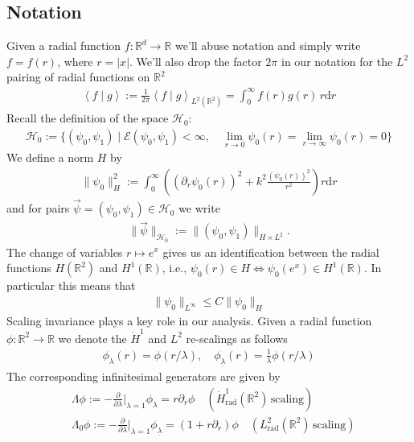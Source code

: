 \documentclass[10pt,reqno]{amsart}
\newcommand{\E}{\mathcal{E}}
\newcommand{\HH}{\mathcal{H}}
\newcommand{\R}{\mathbb{R}}
\newcommand{\la}{\lambda}
\newcommand{\La}{\Lambda}
\newcommand{\p}{\partial}
\newcommand{\ang}[1]{\left\langle{#1}\right\rangle}
\newcommand{\abs}[1]{\left\lvert{#1}\right\rvert}
\newcommand{\EQ}[1]{\begin{equation}\begin{split} #1 \end{split}\end{equation}}
\numberwithin{equation}{section}
\theoremstyle{remark}
\newcommand{\ula}{\underline{\lambda}}
\newcommand{\ud}{\mathrm{d}}
\newcommand{\0}{\emptyset}
\begin{document}
 \subsection{Notation} 
Given a radial function $f: \R^d \to \R$ we'll abuse notation and simply write $f = f(r)$, where $r = \abs{x}$. We'll also drop the factor $2\pi$ in our notation for the $L^2$ pairing of radial functions on $\R^2$ 
\EQ{
\ang{f \mid g}  := \frac{1}{2\pi}\ang{ f \mid g}_{L^2(\R^2)} = \int_0^\infty f(r) g(r) \, r \ud r
}
Recall the definition of the space $\HH_0$:
\EQ{
\HH_0:= \{ (\psi_0, \psi_1) \mid \E(\psi_0, \psi_1)< \infty, \quad \lim_{r \to 0} \psi_0(r) = \lim_{r \to \infty} \psi_0(r) = 0 \}
}
We define a norm $H$ by 
 \EQ{
 \| \psi_0 \|_{H}^2 := \int_0^\infty  \left(( \p_r \psi_0(r))^2 +  k^2  \frac{(\psi_0(r))^2}{r^2} \right)  r \ud r 
  }
 and for pairs $\vec \psi = (\psi_0, \psi_1) \in \HH_0$ we write  
 \EQ{
 \| \vec \psi \|_{\HH_0} := \| (\psi_0, \psi_1)\|_{H \times L^2}.
 }
The change of variables $r \mapsto e^x$ gives us an identification between the radial functions $H(\R^2)$ and $H^1(\R)$, i.e., $\psi_0(r) \in H \Leftrightarrow \psi_0(e^x) \in H^1(\R)$. In particular this means that 
\EQ{
 \| \psi_0 \|_{L^{\infty}} \le C \| \psi_0 \|_{H}
}
Scaling invariance plays a key role in our analysis.
Given a radial function $\phi: \R^2  \to \R$ we denote the $\dot H^1$ and $L^2$  re-scalings as follows 
\EQ{ \label{eq:scaledef} 
\phi_\la(r) = \phi(r/ \la), \quad
\phi_{\ula}(r)  = \frac{1}{\la} \phi(r/ \la)
}
The corresponding infinitesimal generators  are given by 
\EQ{ \label{eq:LaLa0} 
&\La \phi := -\frac{\partial}{\partial \lambda}\bigg|_{\lambda = 1} \phi_\la = r \p_r \phi  \quad (\dot H^1_{\textrm{rad}}(\R^2) \,  \textrm{scaling}) \\
& \La_0 \phi := -\frac{\partial}{\partial \lambda}\bigg|_{\lambda = 1} \phi_{\ula} = (1 + r \p_r ) \phi  \quad (L^2_{\textrm{rad}}(\R^2) \,  \textrm{scaling})
}

 
 
\end{document}
